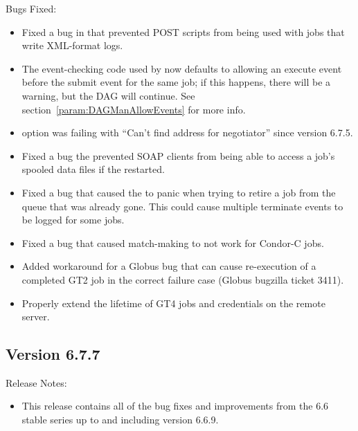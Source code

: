 \noindent Bugs Fixed:

\begin{itemize}

\item Fixed a bug in  that prevented POST scripts
from being used with jobs that write XML-format logs.

\item The event-checking code used by  now defaults
to allowing an execute event before the submit event for the same
job; if this happens, there will be a warning, but the DAG will
continue.  See section~\ref{param:DAGManAllowEvents} for more info.

\item {} option  was failing with ``Can't
find address for negotiator'' since version 6.7.5.

\item Fixed a bug the prevented SOAP clients from being able to access
a job's spooled data files if the  restarted.

\item Fixed a bug that caused the  to panic when
trying to retire a job from the queue that was already gone. This
could cause multiple terminate events to be logged for some jobs.

\item Fixed a bug that caused match-making to not work for Condor-C
jobs.

\item Added workaround for a Globus bug that can cause re-execution of
a completed GT2 job in the correct failure case (Globus bugzilla ticket
3411).

\item Properly extend the lifetime of GT4 jobs and credentials on the
remote server.

\end{itemize}

\subsection{\label{sec:New-6-7-7}Version 6.7.7}

\noindent Release Notes:

\begin{itemize}

\item This release contains all of the bug fixes and improvements from
  the 6.6 stable series up to and including version 6.6.9.

\end{itemize}

